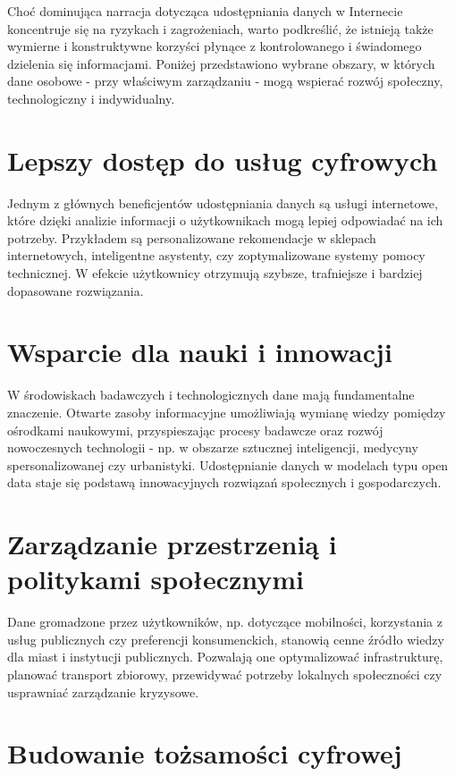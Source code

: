 Choć dominująca narracja dotycząca udostępniania danych w Internecie koncentruje się na ryzykach i zagrożeniach, warto podkreślić, że istnieją także wymierne i konstruktywne korzyści płynące z kontrolowanego i świadomego dzielenia się informacjami. Poniżej przedstawiono wybrane obszary, w których dane osobowe - przy właściwym zarządzaniu - mogą wspierać rozwój społeczny, technologiczny i indywidualny.\cite{STRATEGIE}

\section{Lepszy dostęp do usług cyfrowych}

Jednym z głównych beneficjentów udostępniania danych są usługi internetowe, które dzięki analizie informacji o użytkownikach mogą lepiej odpowiadać na ich potrzeby. Przykładem są personalizowane rekomendacje w sklepach internetowych, inteligentne asystenty, czy zoptymalizowane systemy pomocy technicznej. W efekcie użytkownicy otrzymują szybsze, trafniejsze i bardziej dopasowane rozwiązania.

\section{Wsparcie dla nauki i innowacji}

W środowiskach badawczych i technologicznych dane mają fundamentalne znaczenie. Otwarte zasoby informacyjne umożliwiają wymianę wiedzy pomiędzy ośrodkami naukowymi, przyspieszając procesy badawcze oraz rozwój nowoczesnych technologii - np. w obszarze sztucznej inteligencji, medycyny spersonalizowanej czy urbanistyki. Udostępnianie danych w modelach typu open data staje się podstawą innowacyjnych rozwiązań społecznych i gospodarczych.

\section{Zarządzanie przestrzenią i politykami społecznymi}

Dane gromadzone przez użytkowników, np. dotyczące mobilności, korzystania z usług publicznych czy preferencji konsumenckich, stanowią cenne źródło wiedzy dla miast i instytucji publicznych. Pozwalają one optymalizować infrastrukturę, planować transport zbiorowy, przewidywać potrzeby lokalnych społeczności czy usprawniać zarządzanie kryzysowe.

\section{Budowanie tożsamości cyfrowej}

